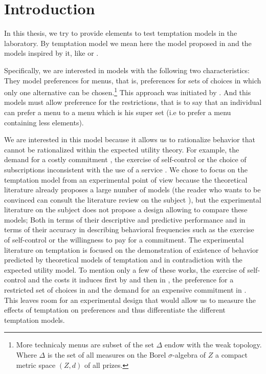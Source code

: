 \documentclass[
]{book}
\begin{document}
\hypertarget{intro1}{%
\chapter*{Introduction}\label{intro1}}

In this thesis, we try to provide elements to test temptation models in the
laboratory.
By temptation model we mean here the model proposed in \citet{gul2001temptation} and
the models inspired by it, like \citet{noor2010uphill} or \citet{noor2015menu}.

Specifically, we are interested in models with the following two characteristics:
They model preferences for menus, that is, preferences for sets of choices in
which only one alternative can be chosen.\footnote{More technicaly menus are subset of the set \(\Delta\) endow with the weak
  topology.
  Where \(\Delta\) is the set of all measures on the Borel \(\sigma\)-algebra of \(Z\) a
  compact metric space \((Z,d)\) of all prizes.}
This approach was initiated by \citet{kreps1979representation}.
And this models must allow preference for the restrictions, that is to say that
an individual can prefer a menu to a menu which is his super set
(i.e to prefer a menu containing less elements).

We are interested in this model because it allows us to rationalize behavior
that cannot be rationalized within the expected utility theory.
For example, the demand for a costly commitment \citep{bryan2010commitment, ashraf2006tying}, the exercise of self-control \citep{dellavigna2004contract} or the choice of subscriptions inconsistent with the use of a service \citep{dellavigna2006paying}.
We chose to focus on the temptation model from an experimental point of view
because the theoretical literature already proposes a large number of models
(the reader who wants to be convinced can consult the literature review on the subject \citet{lipman2013temptation}), but the experimental literature on the subject does not propose a design allowing to compare these models;
Both in terms of their descriptive and predictive performance and in terms of their accuracy in describing behavioral frequencies such as the exercise of self-control or the willingness to pay for a commitment.
The experimental literature on temptation is focused on the demonstration of existence of
behavior predicted by theoretical models of temptation and in contradiction with
the expected utility model.
To mention only a few of these works, the exercise of self-control and the costs
it induces first by \citet{mischel1989delay} and then in \citet{kuhn2014self}, the preference for a
restricted set of choices in \citet{toussaert2018eliciting} and the demand for an expensive
commitment in \citet{houser2018temptation}.
This leaves room for an experimental design that would allow us to measure the
effects of temptation on preferences and thus differentiate the different
temptation models.
\end{document}

